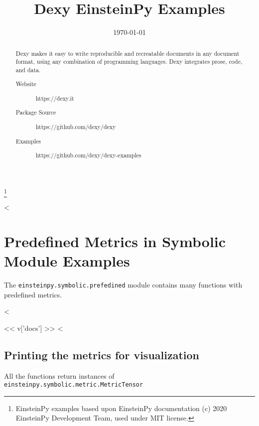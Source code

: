 \documentclass[%
 reprint,
 amsmath,amssymb,
 aps,
]{revtex4-1}
\begin{document}

\title{Dexy EinsteinPy Examples}%
\thanks{EinsteinPy examples based upon EinsteinPy documentation (c) 2020 EinsteinPy Development Team, used under MIT license.}%

\date{\today}%

\begin{abstract}
    Dexy makes it easy to write reproducible and recreatable documents in any
    document format, using any combination of programming languages. Dexy
    integrates prose, code, and data. 
\begin{description}
\item[Website]
https://dexy.it
\item[Package Source]
https://github.com/dexy/dexy
\item[Examples]
https://github.com/dexy/dexy-examples
\end{description}
\end{abstract}

\maketitle


<%

\section{\label{sec:level1}Predefined Metrics in Symbolic Module Examples}

The \verb|einsteinpy.symbolic.prefedined| module contains many functions with predefined metrics.

\begin{description}
<%
    \item[<< k >>] << v['docs'] >>
<%
\end{description}

\subsection{\label{sec:level2}Printing the metrics for visualization}

All the functions return instances of \verb|einsteinpy.symbolic.metric.MetricTensor|
\end{document}
